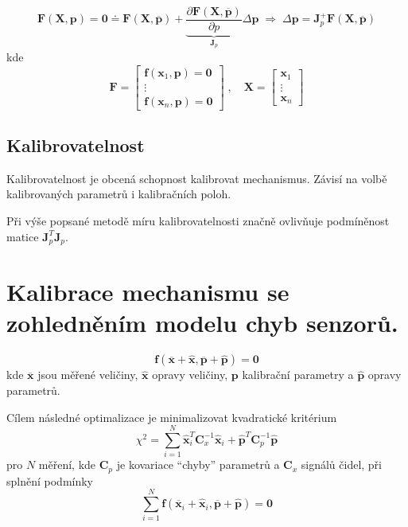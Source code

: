\documentclass{article}
\begin{document}
	\begin{equation}
		\bm{F}(\bm{X},\bm{p})
		=
		\bm{0} \doteq \bm{F}(\bm{X},\bm{\overline{p}})
		+
		\underbrace{\frac{\partial \bm{F}(\bm{X},\bm{\overline{p}})}{\partial p}}_{\bm{J}_p} \Delta\bm{p}
		\;\Rightarrow\;
		\Delta\bm{p} = \bm{J}_p^+ \bm{F}(\bm{X},\bm{\overline{p}})
	\end{equation}
	kde
	\begin{equation}
		\bm{F}
		=
		\begin{bmatrix}
			\bm{f}(\bm{x}_1,\bm{p}) = \bm{0} \\
			\vdots \\
			\bm{f}(\bm{x}_n,\bm{p}) = \bm{0}
		\end{bmatrix}
		\;,\quad 
		\bm{X}
		=
		\begin{bmatrix}
			\bm{x}_1 \\
			\vdots \\
			\bm{x}_n
		\end{bmatrix}
	\end{equation}

	\subsection*{Kalibrovatelnost}

	Kalibrovatelnost je obcená schopnost kalibrovat mechanismus. Závisí na volbě kalibrovaných parametrů i kalibračních poloh.

	Při výše popsané metodě míru kalibrovatelnosti značně ovlivňuje podmíněnost matice $\bm{J}_p^T \bm{J}_p$.

	\section{Kalibrace mechanismu se zohledněním modelu chyb senzorů.}
	\begin{equation}
		\bm{f}(\bm{\overline{x}}+\bm{\hat{x}},\bm{\overline{p}}+\bm{\hat{p}}) = \bm{0}
	\end{equation}
	kde $\bm{\overline{x}}$ jsou měřené veličiny, $\bm{\hat{x}}$ opravy veličiny, $\bm{p}$ kalibrační parametry a $\bm{\hat{p}}$ opravy parametrů.

	Cílem následné optimalizace je minimalizovat kvadratické kritérium
	\begin{equation}
	\chi^2 = \sum_{i=1}^N \bm{\hat{x}}_i^T \bm{C}_x^{-1} \bm{\hat{x}}_i + \bm{\hat{p}}^T \bm{C}_p^{-1} \bm{\hat{p}} 
	\end{equation}
	pro $N$ měření, kde $\bm{C}_p$ je kovariace ``chyby'' parametrů a $\bm{C}_x$ signálů čidel, při splnění podmínky
	\begin{equation}
		\sum_{i=1}^N \bm{f}(\bm{\overline{x}}_i+\bm{\hat{x}}_i,\bm{\overline{p}}+\bm{\hat{p}}) = \bm{0}
	\end{equation}
\end{document}
